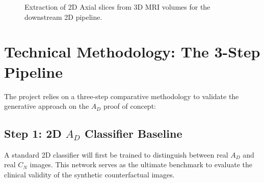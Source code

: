 \documentclass[11pt,a4paper]{article}
\begin{document}
\begin{figure}[ht]
    \centering
    \caption{Extraction of 2D Axial slices from 3D MRI volumes for the downstream 2D pipeline.}
\end{figure}

\section{Technical Methodology: The 3-Step Pipeline}
The project relies on a three-step comparative methodology to validate the generative approach on the $A_D$ proof of concept:

\subsection{Step 1: 2D $A_D$ Classifier Baseline}
A standard 2D classifier will first be trained to distinguish between real $A_D$ and real $C_N$ images. This network serves as the ultimate benchmark to evaluate the clinical validity of the synthetic counterfactual images.
\end{document}

